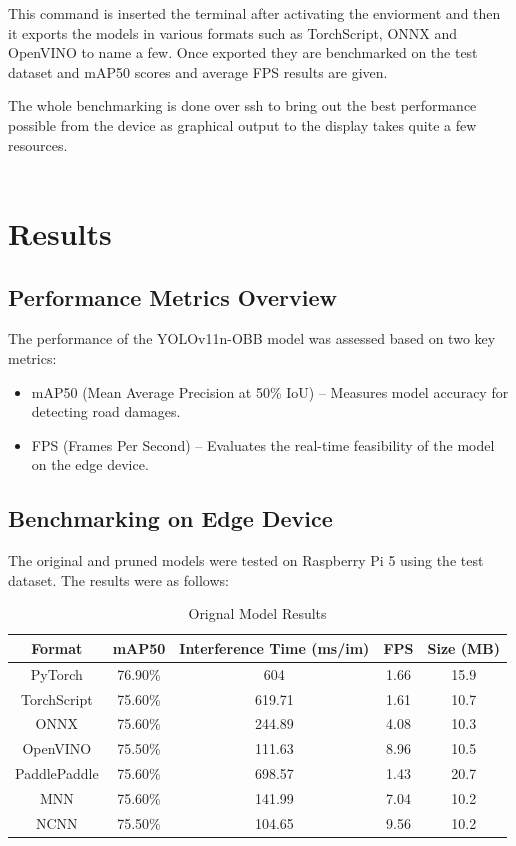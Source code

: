 This command is inserted the terminal after activating the enviorment and then it exports the models in various formats such as TorchScript, ONNX and OpenVINO to name a few. Once exported they are benchmarked on the test dataset and mAP50 scores and average FPS results are given.

The whole benchmarking is done over ssh to bring out the best performance possible from the device as graphical output to the display takes quite a few resources.\\\\

\section{Results}

\subsection{Performance Metrics Overview}

The performance of the YOLOv11n-OBB model was assessed based on two key metrics:
\begin{itemize}
    \item mAP50 (Mean Average Precision at 50\% IoU) – Measures model accuracy for detecting road damages.
    \item FPS (Frames Per Second) – Evaluates the real-time feasibility of the model on the edge device.
\end{itemize}

\subsection{Benchmarking on Edge Device}

The original and pruned models were tested on Raspberry Pi 5 using the test dataset. The results were as follows:

\begin{table}[H]
    \centering
    \begin{tabular}{|c|c|c|c|c|}
        \hline
        \textbf{Format} & \textbf{mAP50} & \textbf{Interference Time (ms/im)} & \textbf{FPS} & \textbf{Size (MB)} \\
        \hline
        PyTorch & 76.90\% & 604 & 1.66 & 15.9 \\
        TorchScript & 75.60\% & 619.71 & 1.61 & 10.7 \\
        ONNX & 75.60\% & 244.89 & 4.08 & 10.3 \\
        OpenVINO & 75.50\% & 111.63 & 8.96 & 10.5 \\
        PaddlePaddle & 75.60\% & 698.57 & 1.43 & 20.7 \\
        MNN & 75.60\% & 141.99 & 7.04 & 10.2 \\
        NCNN & 75.50\% & 104.65 & 9.56 & 10.2 \\
        \hline
    \end{tabular}
    \caption{Orignal Model Results}
    \label{tab:100res}
\end{table}

